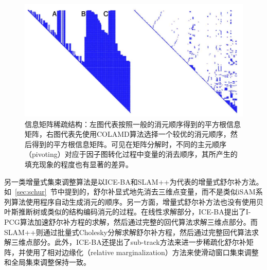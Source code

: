 \begin{figure}[htb!]
    \centering
    \includegraphics[width=.7\textwidth]{Pictures/sparse_pattern.png}
    \caption{信息矩阵稀疏结构\citep{kaess2008isam}：左图代表按照一般的消元顺序得到的平方根信息矩阵，右图代表先使用COLAMD算法选择一个较优的消元顺序，然后得到的平方根信息矩阵。可见在矩阵分解时，不同的主元顺序（pivoting）对应于因子图转化过程中变量的消去顺序，其所产生的填充现象的程度也有显著的差异。}
    \label{fig:fill_in}
\end{figure}

另一类增量式集束调整算法是以ICE-BA和SLAM++为代表的增量式舒尔补方法。如~\ref{sec:schur}~节中提到的，舒尔补显式地先消去三维点变量，而不是类似iSAM系列算法使用程序自动生成消元的顺序。另一方面，增量式舒尔补方法也没有使用贝叶斯推断树或类似的结构编码消元的过程。在线性求解部分，ICE-BA提出了I-PCG算法加速舒尔补方程的求解，然后通过完整的回代算法求解三维点部分。而SLAM++则通过批量式Cholesky分解求解舒尔补方程，然后通过完整回代算法求解三维点部分。此外，ICE-BA还提出了sub-track方法来进一步稀疏化舒尔补矩阵，并使用了相对边缘化（relative marginalization）方法来使滑动窗口集束调整和全局集束调整保持一致。
